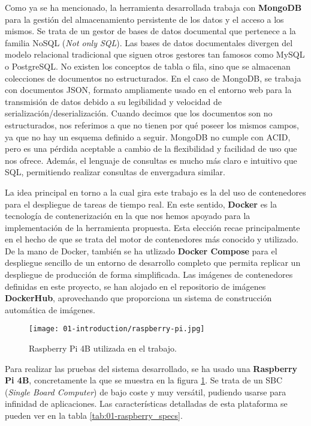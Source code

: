 Como ya se ha mencionado, la herramienta desarrollada trabaja con
\textbf{MongoDB} para la gestión del almacenamiento persistente de los datos y
el acceso a los mismos. Se trata de un gestor de bases de datos documental que
pertenece a la familia NoSQL (\textit{Not only SQL}). Las bases de datos
documentales divergen del modelo relacional tradicional que siguen otros
gestores tan famosos como MySQL o PostgreSQL. No existen los conceptos de tabla
o fila, sino que se almacenan colecciones de documentos no estructurados. En el
caso de MongoDB, se trabaja con documentos JSON, formato ampliamente usado en el
entorno web para la transmisión de datos debido a su legibilidad y velocidad de
serialización/deserialización. Cuando decimos que los documentos son no
estructurados, nos referimos a que no tienen por qué poseer los mismos campos,
ya que no hay un esquema definido a seguir. MongoDB no cumple con ACID, pero es
una pérdida aceptable a cambio de la flexibilidad y facilidad de uso que nos
ofrece. Además, el lenguaje de consultas es mucho más claro e intuitivo que SQL,
permitiendo realizar consultas de envergadura similar.

La idea principal en torno a la cual gira este trabajo es la del uso de
contenedores para el despliegue de tareas de tiempo real. En este sentido,
\textbf{Docker} es la tecnología de contenerización en la que nos hemos apoyado
para la implementación de la herramienta propuesta. Esta elección recae
principalmente en el hecho de que se trata del motor de contenedores más
conocido y utilizado. De la mano de Docker, también se ha utlizado
\textbf{Docker Compose} para el despliegue sencillo de un entorno de desarrollo
completo que permita replicar un despliegue de producción de forma simplificada.
Las imágenes de contenedores definidas en este proyecto, se han alojado en el
repositorio de imágenes \textbf{DockerHub}, aprovechando que proporciona un
sistema de construcción automática de imágenes.

\begin{figure}
      \centering
      \texttt{[image: 01-introduction/raspberry-pi.jpg]}
      \caption{Raspberry Pi 4B utilizada en el trabajo.}
      \label{fig:01-raspberry_pi}
\end{figure}

Para realizar las pruebas del sistema desarrollado, se ha usado una
\textbf{Raspberry Pi 4B}, concretamente la que se muestra en la figura
\ref{fig:01-raspberry_pi}. Se trata de un SBC (\textit{Single Board Computer})
de bajo coste y muy versátil, pudiendo usarse para infinidad de aplicaciones.
Las características detalladas de esta plataforma se pueden ver en la tabla
\ref{tab:01-raspberry_specs}.

